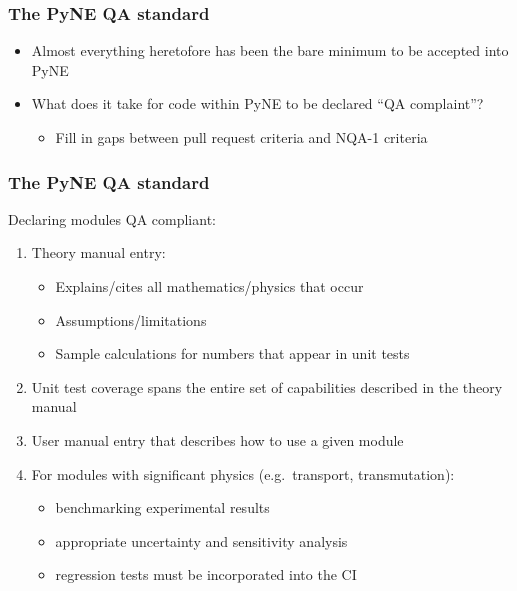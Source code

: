 \documentclass[12pt]{beamer}
\begin{document}
\begin{frame}
\frametitle{The PyNE QA standard}

\begin{itemize}
\item{Almost everything heretofore has been the bare minimum to be accepted into PyNE}
\item{What does it take for code within PyNE to be declared ``QA complaint''?}
    \begin{itemize}
    \item{Fill in gaps between pull request criteria and NQA-1 criteria}
    \end{itemize}
\end{itemize}

\end{frame}

\begin{frame}
\frametitle{The PyNE QA standard}

Declaring modules QA compliant:
\begin{enumerate}
\item{Theory manual entry}:
    \begin{itemize}
    \item{Explains/cites all mathematics/physics that occur}
    \item{Assumptions/limitations}
    \item{Sample calculations for numbers that appear in unit tests}
    \end{itemize}
\item{Unit test coverage spans the entire set of capabilities described in the theory manual}
\item{User manual entry that describes how to use a given module}
\item{For modules with significant physics (e.g.\ transport, transmutation):}
    \begin{itemize}
    \item{benchmarking experimental results}
    \item{appropriate uncertainty and sensitivity analysis}
    \item{regression tests must be incorporated into the CI}
    \end{itemize}
\end{enumerate}

\end{frame}
\end{document}
